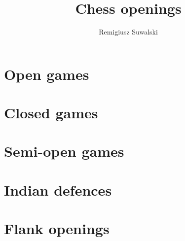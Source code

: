 \documentclass[a4paper,8pt]{extarticle}
\begin{document}
\author{Remigiusz Suwalski}
\title{Chess openings}
\section{Open games}

\section{Closed games}

\section{Semi-open games}

\section{Indian defences}

\section{Flank openings}

\end{document}
